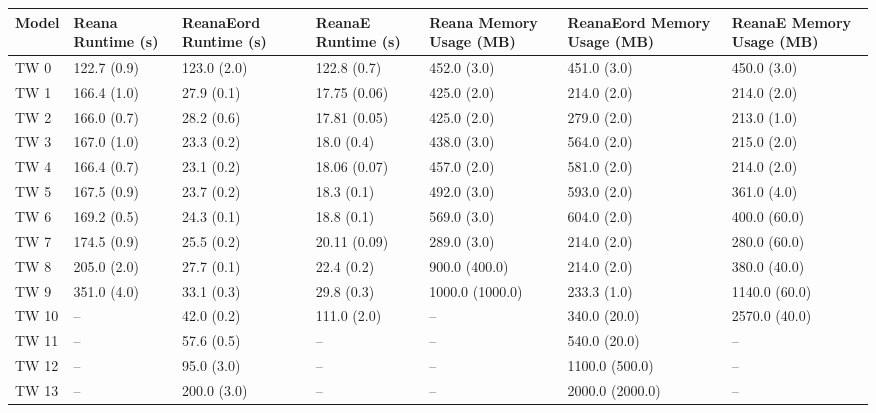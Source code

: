\begin{tabular}{lllllll}
\toprule
Model & Reana Runtime (s) & ReanaEord Runtime (s) & ReanaE Runtime (s) & Reana Memory Usage (MB) & ReanaEord Memory Usage (MB) & ReanaE Memory Usage (MB) \\
\midrule
 TW 0 &       122.7 (0.9) &           123.0 (2.0) &        122.8 (0.7) &             452.0 (3.0) &                 451.0 (3.0) &              450.0 (3.0) \\
 TW 1 &       166.4 (1.0) &            27.9 (0.1) &       17.75 (0.06) &             425.0 (2.0) &                 214.0 (2.0) &              214.0 (2.0) \\
 TW 2 &       166.0 (0.7) &            28.2 (0.6) &       17.81 (0.05) &             425.0 (2.0) &                 279.0 (2.0) &              213.0 (1.0) \\
 TW 3 &       167.0 (1.0) &            23.3 (0.2) &         18.0 (0.4) &             438.0 (3.0) &                 564.0 (2.0) &              215.0 (2.0) \\
 TW 4 &       166.4 (0.7) &            23.1 (0.2) &       18.06 (0.07) &             457.0 (2.0) &                 581.0 (2.0) &              214.0 (2.0) \\
 TW 5 &       167.5 (0.9) &            23.7 (0.2) &         18.3 (0.1) &             492.0 (3.0) &                 593.0 (2.0) &              361.0 (4.0) \\
 TW 6 &       169.2 (0.5) &            24.3 (0.1) &         18.8 (0.1) &             569.0 (3.0) &                 604.0 (2.0) &             400.0 (60.0) \\
 TW 7 &       174.5 (0.9) &            25.5 (0.2) &       20.11 (0.09) &             289.0 (3.0) &                 214.0 (2.0) &             280.0 (60.0) \\
 TW 8 &       205.0 (2.0) &            27.7 (0.1) &         22.4 (0.2) &           900.0 (400.0) &                 214.0 (2.0) &             380.0 (40.0) \\
 TW 9 &       351.0 (4.0) &            33.1 (0.3) &         29.8 (0.3) &         1000.0 (1000.0) &                 233.3 (1.0) &            1140.0 (60.0) \\
TW 10 &                -- &            42.0 (0.2) &        111.0 (2.0) &                      -- &                340.0 (20.0) &            2570.0 (40.0) \\
TW 11 &                -- &            57.6 (0.5) &                 -- &                      -- &                540.0 (20.0) &                       -- \\
TW 12 &                -- &            95.0 (3.0) &                 -- &                      -- &              1100.0 (500.0) &                       -- \\
TW 13 &                -- &           200.0 (3.0) &                 -- &                      -- &             2000.0 (2000.0) &                       -- \\
\bottomrule
\end{tabular}
